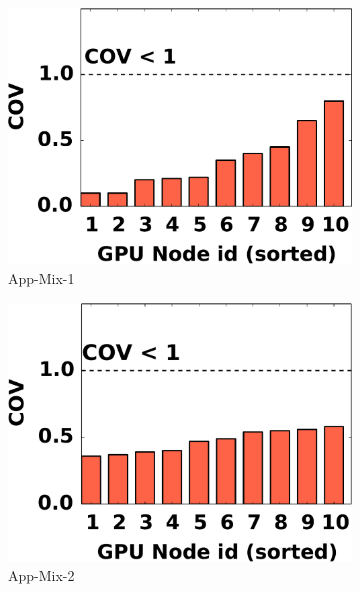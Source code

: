 \begin{figure}[tbp!]
\begin{subfigure}[b]{0.15\textwidth}
  \centering
  \includegraphics[width=.99\linewidth]{figs/app1-cov.pdf}
  \caption{App-Mix-1}
  \label{fig:app1-cov}
\end{subfigure}
\begin{subfigure}[b]{.15\textwidth}
  \centering
  \includegraphics[width=.99\linewidth]{figs/app2-cov.pdf}
  \caption{App-Mix-2}
  \label{fig:app2-cov}
\end{subfigure}
\begin{subfigure}[b]{.15\textwidth}
  \centering

\end{subfigure}
\end{figure}
